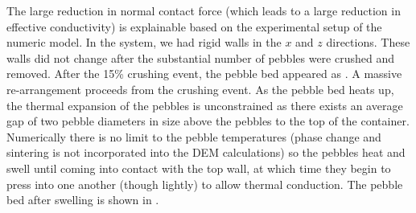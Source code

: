 The large reduction in normal contact force (which leads to a large reduction in effective conductivity) is explainable based on the experimental setup of the numeric model. In the system, we had rigid walls in the $x$ and $z$ directions. These walls did not change after the substantial number of pebbles were crushed and removed. After the 15\% crushing event, the pebble bed appeared as . A massive re-arrangement proceeds from the crushing event. As the pebble bed heats up, the thermal expansion of the pebbles is unconstrained as there exists an average gap of two pebble diameters in size above the pebbles to the top of the container. Numerically there is no limit to the pebble temperatures (phase change and sintering is not incorporated into the DEM calculations) so the pebbles heat and swell until coming into contact with the top wall, at which time they begin to press into one another (though lightly) to allow thermal conduction. The pebble bed after swelling is shown in .

